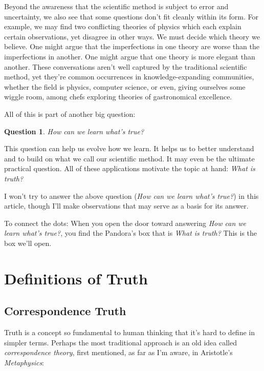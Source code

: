 \documentclass[11pt, oneside]{article}
\newtheorem*{question*}{Question}
\begin{document}
Beyond the awareness that the scientific method is subject to
error and uncertainty, we also
see that some questions don't fit cleanly within its form.
For example, we may find two conflicting theories of physics which
each explain certain observations, yet disagree in other ways. We must decide
which theory we believe. One might argue that the imperfections in one theory are worse
than the imperfections in another. One might argue that one theory is more elegant than
another.
These conversations aren't well captured by the traditional
scientific method, yet
they're common occurrences in knowledge-expanding communities,
whether the field is physics, computer science, or even, giving
ourselves some wiggle room, among chefs exploring theories of gastronomical
excellence.

All of this is part of another big question:

\begin{question*}\label{q2}
    How can we learn what's true?
\end{question*}

This question can help us evolve how we learn.
It helps us to better understand and to build on what we call our
scientific method.
It may even
be the ultimate practical question.
All of these applications motivate
the topic at hand: {\em What is truth?}

I won't try to answer the above question
({\em How can we learn what's true?}) in this article,
though I'll make observations that may serve
as a basis for its answer.

To connect the dots: When you open the door toward answering {\em How can we
learn what's true?}, you find the
Pandora's box that is {\em What is truth?} This is the box we'll open.

\section{Definitions of Truth}\label{s2}

\subsection{Correspondence Truth}

Truth is a concept so fundamental to human thinking that it's hard to define
in simpler terms.
Perhaps the most traditional approach is an old idea called
{\em correspondence theory}, first mentioned, as far
as I'm aware,
in Aristotle's {\em Metaphysics}\/:
\end{document}
